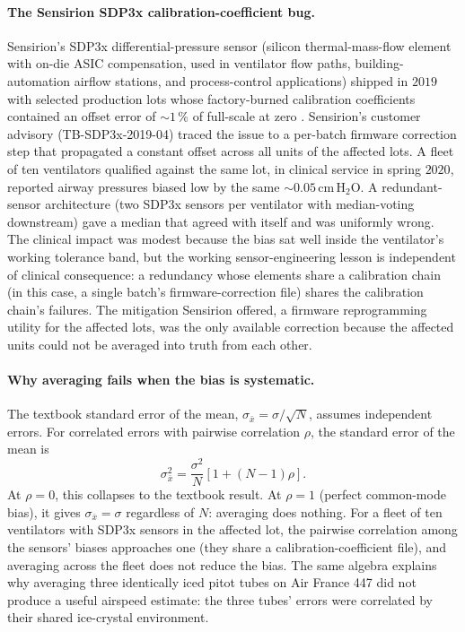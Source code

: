 \paragraph{The Sensirion SDP3x calibration-coefficient bug.}
Sensirion's SDP3x differential-pressure sensor (silicon
thermal-mass-flow element with on-die ASIC compensation, used in
ventilator flow paths, building-automation airflow stations, and
process-control applications) shipped in $2019$ with selected
production lots whose factory-burned calibration coefficients
contained an offset error of $\sim 1\,\%$ of full-scale at zero
\cite{web:ch05t3-sensirion-sdp3x-advisory}. Sensirion's customer
advisory (TB-SDP3x-2019-04) traced the issue to a per-batch
firmware correction step that propagated a constant offset across
all units of the affected lots. A fleet of ten ventilators
qualified against the same lot, in clinical service in spring
$2020$, reported airway pressures biased low by the same
$\sim 0.05 \,\si{\centi\meter}\,\text{H}_{2}\text{O}$. A redundant-
sensor architecture (two SDP3x sensors per ventilator with
median-voting downstream) gave a median that agreed with itself and
was uniformly wrong. The clinical impact was modest because the
bias sat well inside the ventilator's working tolerance band, but
the working sensor-engineering lesson is independent of clinical
consequence: a redundancy whose elements share a calibration
chain (in this case, a single batch's firmware-correction file)
shares the calibration chain's failures. The mitigation Sensirion
offered, a firmware reprogramming utility for the affected lots,
was the only available correction because the affected units could
not be averaged into truth from each other.

\paragraph{Why averaging fails when the bias is systematic.}
The textbook standard error of the mean,
$\sigma_{\bar x} = \sigma / \sqrt{N}$, assumes independent errors.
For correlated errors with pairwise correlation $\rho$, the
standard error of the mean is
\[
\sigma_{\bar x}^{2} = \frac{\sigma^{2}}{N} \left[1 + (N-1) \rho
\right].
\]
At $\rho = 0$, this collapses to the textbook result. At
$\rho = 1$ (perfect common-mode bias), it gives $\sigma_{\bar x}
= \sigma$ regardless of $N$: averaging does nothing. For a fleet
of ten ventilators with SDP3x sensors in the affected lot, the
pairwise correlation among the sensors' biases approaches one (they
share a calibration-coefficient file), and averaging across the
fleet does not reduce the bias. The same algebra explains why
averaging three identically iced pitot tubes on Air France 447 did
not produce a useful airspeed estimate: the three tubes' errors
were correlated by their shared ice-crystal environment.

